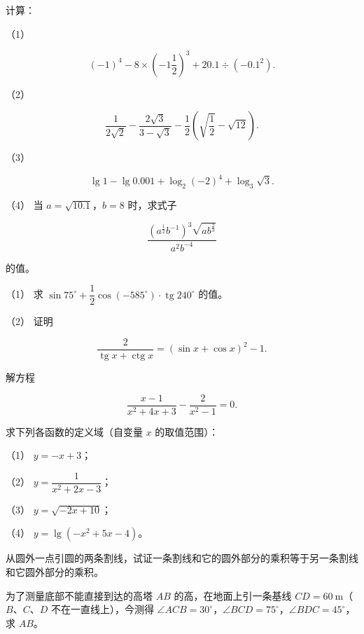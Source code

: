 \begin{question}
计算：

（1） 

\nopagebreak[4]
\[
(-1)^4-8\times\left(-1\frac12\right)^3+20.1\div(-0.1^2).
\]

（2） 

\nopagebreak[4]
\[
\frac1{2\sqrt2}-\frac{2\sqrt3}{3-\sqrt3}-\frac12\left(\sqrt{\frac12}-\sqrt{12}\right).
\]

（3） 

\nopagebreak[4]
\[
\lg1-\lg0.001+\log_2(-2)^4+\log_3\sqrt3.
\]

（4） 当 $a=\sqrt{10.1}$，$b=8$ 时，求式子

\nopagebreak[4]
\[
\frac{\left(a^{\frac12}b^{-1}\right)^3\sqrt{ab^{\frac23}}}{a^2b^{-4}}
\]

的值。

\end{question}
\begin{question}

（1） 求 $\sin75^\circ+\dfrac12\cos(-585^\circ)\cdot\operatorname{tg}240^\circ$ 的值。

（2） 证明

\nopagebreak[4]
\[
\frac{2}{\operatorname{tg}x+\operatorname{ctg}x}=(\sin x+\cos x)^2-1.
\]

\end{question}
\begin{question}
解方程

\nopagebreak[4]
\[
\frac{x-1}{x^2+4x+3}-\frac{2}{x^2-1}=0.
\]

\end{question}
\begin{question}
求下列各函数的定义域（自变量 $x$ 的取值范围）：

（1） $y=-x+3$；

（2） $y=\dfrac1{x^2+2x-3}$；

（3） $y=\sqrt{-2x+10}$；

（4） $y=\lg(-x^2+5x-4)$。

\end{question}
\begin{question}
从圆外一点引圆的两条割线，试证一条割线和它的圆外部分的乘积等于另一条割线和它圆外部分的乘积。

\Needspace{0.4\textheight}
\end{question}
\begin{question}
为了测量底部不能直接到达的高塔 $AB$ 的高，在地面上引一条基线 $CD=60\ \mathrm m$（$B$、$C$、$D$ 不在一直线上），今测得 $\angle ACB=30^\circ$，$\angle BCD=75^\circ$，$\angle BDC=45^\circ$，求 $AB$。
\nopagebreak[4]
\begin{center}\end{center}
\nopagebreak[4]
\end{question}
